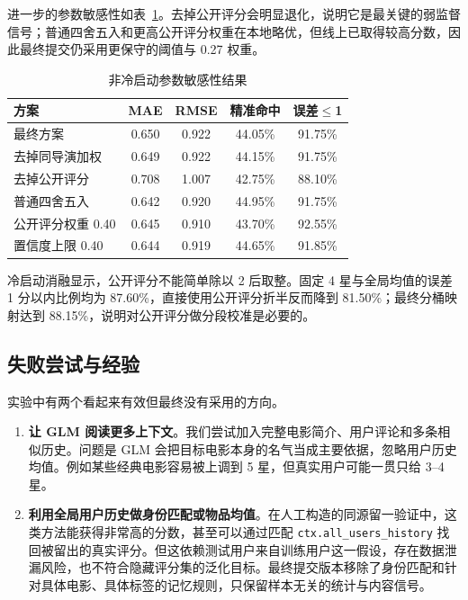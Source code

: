 \documentclass[UTF8,a4paper,10pt,fontset=none]{ctexart}
\begin{document}
进一步的参数敏感性如表~\ref{tab:sensitivity}。去掉公开评分会明显退化，说明它是最关键的弱监督信号；普通四舍五入和更高公开评分权重在本地略优，但线上已取得较高分数，因此最终提交仍采用更保守的阈值与 0.27 权重。

\begin{table}[htbp]
    \centering
    \setlength{\tabcolsep}{7pt}
    \caption{非冷启动参数敏感性结果}
    \label{tab:sensitivity}
    \small
    \begin{tabular}{@{}lcccc@{}}
        \toprule
        \textbf{方案} & \textbf{MAE} & \textbf{RMSE} & \textbf{精准命中} & \textbf{误差$\le$1} \\
        \midrule
        最终方案 & 0.650 & 0.922 & 44.05\% & 91.75\% \\
        去掉同导演加权 & 0.649 & 0.922 & 44.15\% & 91.75\% \\
        去掉公开评分 & 0.708 & 1.007 & 42.75\% & 88.10\% \\
        普通四舍五入 & 0.642 & 0.920 & 44.95\% & 91.75\% \\
        公开评分权重 0.40 & 0.645 & 0.910 & 43.70\% & 92.55\% \\
        置信度上限 0.40 & 0.644 & 0.919 & 44.65\% & 91.85\% \\
        \bottomrule
    \end{tabular}
\end{table}

冷启动消融显示，公开评分不能简单除以 2 后取整。固定 4 星与全局均值的误差 1 分以内比例均为 87.60\%，直接使用公开评分折半反而降到 81.50\%；最终分桶映射达到 88.15\%，说明对公开评分做分段校准是必要的。

\subsection{失败尝试与经验}

实验中有两个看起来有效但最终没有采用的方向。

\begin{enumerate}
    \item \textbf{让 GLM 阅读更多上下文}。我们尝试加入完整电影简介、用户评论和多条相似历史。问题是 GLM 会把目标电影本身的名气当成主要依据，忽略用户历史均值。例如某些经典电影容易被上调到 5 星，但真实用户可能一贯只给 3--4 星。
    \item \textbf{利用全局用户历史做身份匹配或物品均值}。在人工构造的同源留一验证中，这类方法能获得非常高的分数，甚至可以通过匹配 \texttt{ctx.all\_users\_history} 找回被留出的真实评分。但这依赖测试用户来自训练用户这一假设，存在数据泄漏风险，也不符合隐藏评分集的泛化目标。最终提交版本移除了身份匹配和针对具体电影、具体标签的记忆规则，只保留样本无关的统计与内容信号。
\end{enumerate}
\end{document}
